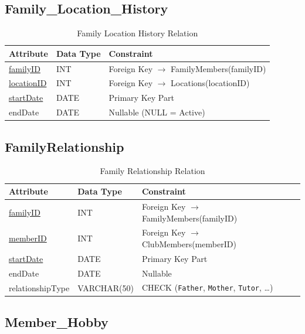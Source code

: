 \documentclass[11pt,a4paper]{article}
\begin{document}
\subsection{Family\_Location\_History}

\begin{table}[H]
\centering
\begin{tabular}{lll}
\toprule
Attribute & Data Type & Constraint \\
\midrule
\underline{familyID} & INT & Foreign Key $\rightarrow$ FamilyMembers(familyID) \\
\underline{locationID} & INT & Foreign Key $\rightarrow$ Locations(locationID) \\
\underline{startDate} & DATE & Primary Key Part \\
endDate & DATE & Nullable (NULL = Active) \\
\bottomrule
\end{tabular}
\caption{Family Location History Relation}
\end{table}


\subsection{FamilyRelationship}

\begin{table}[H]
\centering
\begin{tabular}{lll}
\toprule
Attribute & Data Type & Constraint \\
\midrule
\underline{familyID} & INT & Foreign Key $\rightarrow$ FamilyMembers(familyID) \\
\underline{memberID} & INT & Foreign Key $\rightarrow$ ClubMembers(memberID) \\
\underline{startDate} & DATE & Primary Key Part \\
endDate & DATE & Nullable \\
relationshipType & VARCHAR(50) & CHECK (\texttt{Father}, \texttt{Mother}, \texttt{Tutor}, \dots) \\
\bottomrule
\end{tabular}
\caption{Family Relationship Relation}
\end{table}


\subsection{Member\_Hobby}
\end{document}
